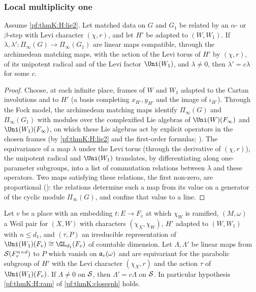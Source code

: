 \subsubsection{Local multiplicity one}\label{sec:pf:thmK:multone}

\begin{proposition}\label{pf:thmK:archmult}
Assume \ref{pf:thmK:H:lie2}. Let matched data on $G$ and $G_1$ be related by an $\alpha$- or $\beta$-step with Levi
character $(\chi,r)$, and let $H'$ be adapted to $(W,W_1)$. If $\lambda,\lambda'\colon\Pi_\infty(G)\to\Pi_\infty(G_1)$ are
linear maps compatible, through the archimedean matching maps, with the action of the Levi torus of $H'$ by $(\chi,r)$, of
its unipotent radical and of the Levi factor $\Uni(W_1)$, and $\lambda\ne0$, then $\lambda'=c\lambda$ for some $c$.
\end{proposition}

\begin{proof}
Choose, at each infinite place, frames of $W$ and $W_1$ adapted to the Cartan involutions and to $H'$ (a basis completing
$x_{H'},y_{H'}$ and the image of $\iota_{H'}$). Through the Fock model, the archimedean matching maps identify
$\Pi_\infty(G)$ and $\Pi_\infty(G_1)$ with modules over the complexified Lie algebras of $\Uni(W)(F_\infty)$ and
$\Uni(W_1)(F_\infty)$, on which these Lie algebras act by explicit operators in the chosen frames (by \ref{pf:thmK:H:lie2}
and the first-order formulas; ). The equivariance of a map
$\lambda$ under the Levi torus (through the derivative of $(\chi,r)$), the unipotent radical and $\Uni(W_1)$ translates,
by differentiating along one-parameter subgroups, into a list of commutation relations between $\lambda$ and these
operators. Two maps satisfying these relations, the first non-zero, are proportional
(): the relations determine such a map from its value on a
generator of the cyclic module $\Pi_\infty(G)$, and confine that value to a line.
\end{proof}

\begin{proposition}\label{pf:thmK:rammult}
Let $v$ be a place with an embedding $t\colon E\to F_v$ at which $\chi_W$ is ramified, $(M,\omega)$ a Weil pair for $(X,W)$
with characters $(\chi_X,\chi_W)$, $H'$ adapted to $(W,W_1)$ with $n\le d_1$, and $(\tau,P)$ an irreducible representation of
$\Uni(W_1)(F_v)\cong\GL_{d_1}(F_v)$ of countable dimension. Let $\Lambda,\Lambda'$ be linear maps from
$\mathcal{S}(F_v^{n\times d})$ to $P$ which vanish on $\mathfrak{a}_v(\omega)$ and are equivariant for the parabolic subgroup of $H'$
with the Levi character $(\chi_X,r)$ and the action $\tau$ of $\Uni(W_1)(F_v)$. If $\Lambda\ne0$ on $\mathcal{S}$, then
$\Lambda'=c\Lambda$ on $\mathcal{S}$. In particular hypothesis \ref{pf:thmK:H:ram} of \cref{pf:thmK:closesph} holds.
\end{proposition}

